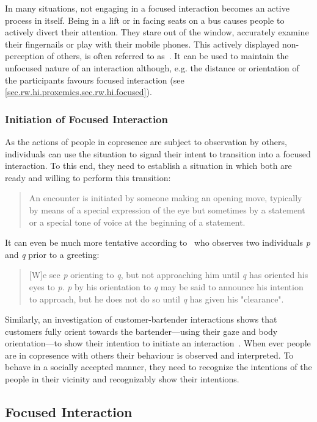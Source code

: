 In many situations, not engaging in a \gls{focused interaction} becomes an active process in itself.
Being  in a lift or in facing seats on a bus causes people to actively divert their attention.
They stare out of the window, accurately examine their fingernails or play with their mobile phones.
This actively displayed non-perception of others, is often referred to as~\cite[p. 84]{goffman1963}.
It can be used to maintain the unfocused nature of an interaction although, e.g. the distance or orientation of the participants favours \gls{focused interaction} (see \cref{sec.rw.hi.proxemics,sec.rw.hi.focused}).

\subsubsection{Initiation of Focused Interaction}\label{sec.rw.hi.unfocused.init}

As the actions of people in \gls{copresence} are subject to observation by others, individuals can use the situation to signal their intent to transition into a \gls{focused interaction}.
To this end, they need to establish a situation in which both are ready and willing to perform this transition:
\blockcquote[p. 91]{goffman1963}{An encounter is initiated by someone making an opening move, typically by means of a special expression of the eye but sometimes by a statement or a special tone of voice at the beginning of a statement.}
It can even be much more tentative according to~ who observes two individuals \emph{p} and \emph{q} prior to a greeting:
\blockcquote[p. 170]{kendon1990}{[W]e see \emph{p} orienting to \emph{q}, but not approaching him until \emph{q} has oriented his eyes to \emph{p}. \emph{p} by his orientation to \emph{q} may be said to announce his intention to approach, but he does not do so until \emph{q} has given his "clearance".}
Similarly, an investigation of customer-bartender interactions shows that customers fully orient towards the bartender---using their gaze and body orientation---to show their intention to initiate an interaction~\cite[]{Gaschler2012a}.
When ever people are in \gls{copresence} with others their behaviour is observed and interpreted.
To behave in a socially accepted manner, they need to recognize the intentions of the people in their vicinity and recognizably show their intentions.

\subsection{Focused Interaction}\label{sec.rw.hi.focused}

